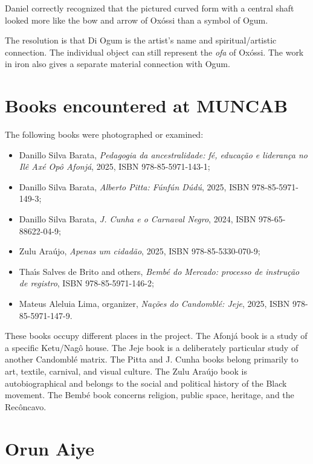 Daniel correctly recognized that the
pictured curved form with a central shaft
looked more like the bow and arrow of
Ox\'ossi than a symbol of Ogum.

The resolution is that Di Ogum is the
artist's name and spiritual/artistic
connection.  The individual object can
still represent the \emph{ofa} of Ox\'ossi.
The work in iron also gives a separate
material connection with Ogum.

\section{Books encountered at MUNCAB}

The following books were photographed or
examined:

\begin{itemize}
\item Danillo Silva Barata,
\emph{Pedagogia da ancestralidade: f\'e,
educa\c{c}\~ao e lideran\c{c}a no Il\^e Ax\'e
Op\^o Afonj\'a}, 2025,
ISBN 978-85-5971-143-1;
\item Danillo Silva Barata,
\emph{Alberto Pitta: F\'unf\'un D\'ud\'u},
2025, ISBN 978-85-5971-149-3;
\item Danillo Silva Barata,
\emph{J. Cunha e o Carnaval Negro}, 2024,
ISBN 978-65-88622-04-9;
\item Zulu Ara\'ujo,
\emph{Apenas um cidad\~ao}, 2025,
ISBN 978-85-5330-070-9;
\item Tha\'\i s Salves de Brito and others,
\emph{Bemb\'e do Mercado: processo de
instru\c{c}\~ao de registro},
ISBN 978-85-5971-146-2;
\item Mateus Aleluia Lima, organizer,
\emph{Na\c{c}\~oes do Candombl\'e: Jeje},
2025, ISBN 978-85-5971-147-9.
\end{itemize}

These books occupy different places in the
project.  The Afonj\'a book is a study of a
specific Ketu/Nag\^o house.  The Jeje book
is a deliberately particular study of
another Candombl\'e matrix.  The Pitta and
J. Cunha books belong primarily to art,
textile, carnival, and visual culture.  The
Zulu Ara\'ujo book is autobiographical and
belongs to the social and political history
of the Black movement.  The Bemb\'e book
concerns religion, public space, heritage,
and the Rec\^oncavo.

\section{Orun Aiye}


